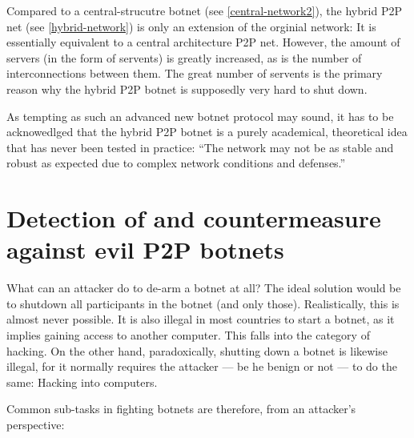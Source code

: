 \documentclass{llncs}
\begin{document}
Compared to a central-strucutre botnet (see \ref{central-network2}),
the hybrid P2P net (see \ref{hybrid-network}) is only an extension of the
orginial network: It is essentially equivalent to a central
architecture P2P net. However, the amount of servers (in the form of
servents) is greatly increased, as is the number of interconnections
between them. The great number of servents is the primary reason why
the hybrid P2P botnet is supposedly very hard to shut
down.\cite{td1sc}

As tempting as such an advanced new botnet protocol may sound, it has
to be acknowedlged that the hybrid P2P botnet is a purely academical,
theoretical idea that has never been tested in practice: ``The network
may not be as stable and robust as expected due to complex network
conditions and defenses.''\cite{wang2009systematic}


\section{Detection of and countermeasure against evil P2P botnets}
\label{counter-measure}
What can an attacker do to de-arm a botnet at all? The ideal solution
would be to shutdown all participants in the botnet (and only
those). Realistically, this is almost never possible. It is also
illegal in most countries to start a botnet, as it implies gaining
access to another computer. This falls into the category of
hacking. On the other hand, paradoxically, shutting down a botnet is
likewise illegal, for it normally requires the attacker --- be he
benign or not --- to do the same: Hacking into computers. 

Common sub-tasks in fighting botnets are therefore, from an attacker's
perspective:
\end{document}
